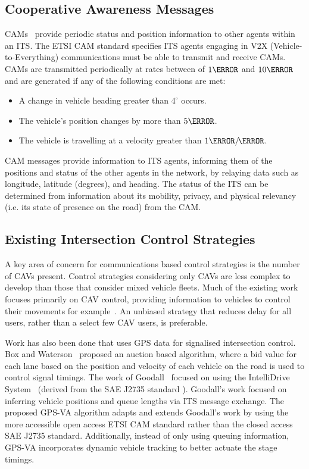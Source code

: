 \documentclass[numbered]{trbunofficial}
\newcommand{\sidiv}{/\hspace{-1.5pt}} %
\begin{document}
\subsection{Cooperative Awareness Messages}\label{sec:cam}
CAMs~\cite{EtsiCAM2011} provide periodic status and position information to other agents within an ITS. The ETSI CAM standard specifies ITS agents engaging in V2X (Vehicle-to-Everything) communications must be able to transmit and receive CAMs. CAMs are transmitted periodically at rates between of $1\Hz$ and $10\Hz$ and are generated if any of the following conditions are met:
\begin{itemize}
	\vspace{1pt}
	\item A change in vehicle heading greater than $4^\circ$ occurs.
	\item The vehicle's position changes by more than $5\m$. 
	\item The vehicle is travelling at a velocity greater than $1\m\sidiv\s$.
	\vspace{1pt}
\end{itemize}
CAM messages provide information to ITS agents, informing them of the positions and status of the other agents in the network, by relaying data such as longitude, latitude (degrees), and heading. The status of the ITS can be determined from information about its mobility, privacy, and physical relevancy (i.e. its state of presence on the road) from the CAM. 

\subsection{Existing Intersection Control Strategies}\label{sec:ctrlinfo}
A key area of concern for communications based control strategies is the number of CAVs present. Control strategies considering only CAVs are less complex to develop than those that consider mixed vehicle fleets. Much of the existing work focuses primarily on CAV control, providing information to vehicles to control their movements for example~\cite{Au2015, HomChaudhuri2016}. An unbiased strategy that reduces delay for all users, rather than a select few CAV users, is preferable.

Work has also been done that uses GPS data for signalised intersection control. Box and Waterson~\cite{box10a} proposed an auction based algorithm, where a bid value for each lane based on the position and velocity of each vehicle on the road is used to control signal timings. The work of Goodall~\cite{goodall2013} focused on using the IntelliDrive System~\cite{smith2011} (derived from the SAE J2735 standard \cite{saej2735}). Goodall's work focused on inferring vehicle positions and queue lengths via ITS message exchange. The proposed GPS-VA algorithm adapts and extends Goodall's work by using the more accessible open access ETSI CAM standard rather than the closed access SAE J2735 standard. Additionally, instead of only using queuing information, GPS-VA incorporates dynamic vehicle tracking to better actuate the stage timings.
\end{document}
